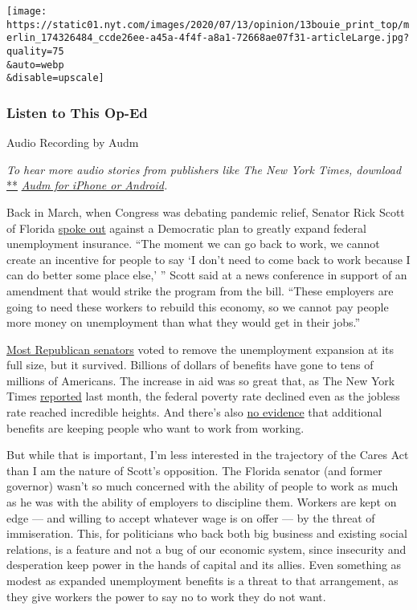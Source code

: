 \texttt{[image: https://static01.nyt.com/images/2020/07/13/opinion/13bouie\_print\_top/merlin\_174326484\_ccde26ee-a45a-4f4f-a8a1-72668ae07f31-articleLarge.jpg?quality=75\\\&auto=webp\\\&disable=upscale]}

\hypertarget{listen-to-this-op-ed}{%
\subsubsection{Listen to This Op-Ed}\label{listen-to-this-op-ed}}

Audio Recording by Audm

\emph{To hear more audio stories from publishers like The New York
Times, download}
\href{https://www.audm.com/?utm_source=nytmag\&utm_medium=embed\&utm_campaign=left_behind_draper}{**}
\href{https://www.audm.com/?utm_source=nytopinion\&utm_medium=embed\&utm_campaign=trump_see_you}{\emph{Audm
for iPhone or Android}}\emph{.}

Back in March, when Congress was debating pandemic relief, Senator Rick
Scott of Florida
\href{https://twitter.com/thehill/status/1242894562823151616?s=21}{spoke
out} against a Democratic plan to greatly expand federal unemployment
insurance. ``The moment we can go back to work, we cannot create an
incentive for people to say `I don't need to come back to work because I
can do better some place else,' '' Scott said at a news conference in
support of an amendment that would strike the program from the bill.
``These employers are going to need these workers to rebuild this
economy, so we cannot pay people more money on unemployment than what
they would get in their jobs.''

\href{https://thehill.com/homenews/senate/489589-senate-rejects-gop-attempt-to-change-unemployment-benefits-in-stimulus-bill}{Most
Republican senators} voted to remove the unemployment expansion at its
full size, but it survived. Billions of dollars of benefits have gone to
tens of millions of Americans. The increase in aid was so great that, as
The New York Times
\href{https://www.nytimes.com/2020/06/21/us/politics/coronavirus-poverty.html\#click=https://t.co/6LfQmIUQ2G}{reported}
last month, the federal poverty rate declined even as the jobless rate
reached incredible heights. And there's also
\href{https://www.cnbc.com/2020/06/25/people-receiving-unemployment-benefits-are-more-likely-to-look-for-jobs.html}{no
evidence} that additional benefits are keeping people who want to work
from working.

But while that is important, I'm less interested in the trajectory of
the Cares Act than I am the nature of Scott's opposition. The Florida
senator (and former governor) wasn't so much concerned with the ability
of people to work as much as he was with the ability of employers to
discipline them. Workers are kept on edge --- and willing to accept
whatever wage is on offer --- by the threat of immiseration. This, for
politicians who back both big business and existing social relations, is
a feature and not a bug of our economic system, since insecurity and
desperation keep power in the hands of capital and its allies. Even
something as modest as expanded unemployment benefits is a threat to
that arrangement, as they give workers the power to say no to work they
do not want.

